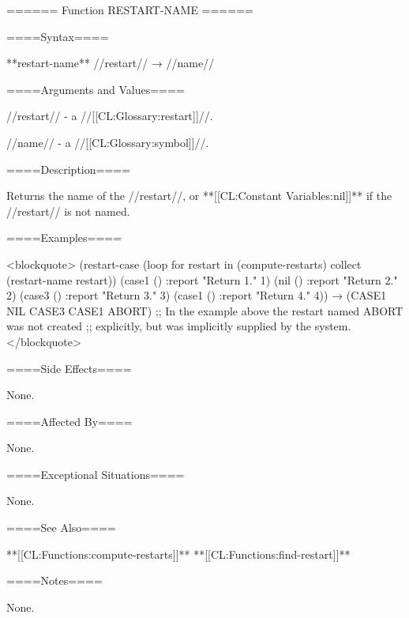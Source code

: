 ====== Function RESTART-NAME ======

====Syntax====

**restart-name** //restart// → //name//

====Arguments and Values====

//restart// - a //[[CL:Glossary:restart]]//.

//name// - a //[[CL:Glossary:symbol]]//.

====Description====

Returns the name of the //restart//, or **[[CL:Constant Variables:nil]]** if the //restart// is not named.

====Examples====

<blockquote> (restart-case (loop for restart in (compute-restarts) collect (restart-name restart)) (case1 () :report "Return 1." 1) (nil () :report "Return 2." 2) (case3 () :report "Return 3." 3) (case1 () :report "Return 4." 4)) → (CASE1 NIL CASE3 CASE1 ABORT) ;; In the example above the restart named ABORT was not created ;; explicitly, but was implicitly supplied by the system. </blockquote>

====Side Effects====

None.

====Affected By====

None.

====Exceptional Situations====

None.

====See Also====

**[[CL:Functions:compute-restarts]]** **[[CL:Functions:find-restart]]**

====Notes====

None.

